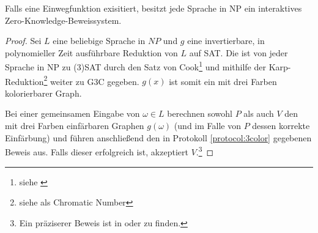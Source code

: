 \vspace{0.2cm}

\begin{theorem}
Falls eine Einwegfunktion exisitiert, besitzt jede Sprache in NP ein interaktives Zero-Knowledge-Beweissystem.
\end{theorem}

\begin{proof}
Sei \( L \) eine beliebige Sprache in \( NP \) und \( g \) eine invertierbare, in polynomieller Zeit ausführbare Reduktion von \( L \) auf SAT. Die ist von jeder Sprache in NP zu (3)SAT durch den Satz von Cook\footnote{siehe \cite{cook}} und mithilfe der Karp-Reduktion\footnote{siehe \cite{karp} als Chromatic Number} weiter zu G3C gegeben. \( g \left( x \right) \) ist somit ein mit drei Farben kolorierbarer Graph.

Bei einer gemeinsamen Eingabe von \( \omega \in L \) berechnen sowohl \( P \) als auch \( V \) den mit drei Farben einfärbaren Graphen \( g \left( \omega \right) \) (und im Falle von \( P\) dessen korrekte Einfärbung)  und führen anschließend den in Protokoll \ref{protocol:3color} gegebenen Beweis aus. Falls dieser erfolgreich ist, akzeptiert \( V \).\footnote{Ein präziserer Beweis ist in \cite[Theorem 5+6]{np} oder \cite[Seite 14]{20yearszeroknowledge} zu finden.}
\end{proof}

\pagebreak